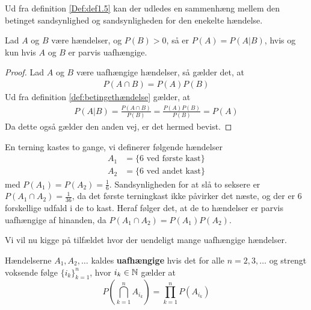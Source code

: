 Ud fra definition \ref{Def:def1.5} kan der udledes en sammenhæng mellem den betinget sandsynlighed og sandsynligheden for den enekelte hændelse. 
\begin{cor} %
    Lad $A$ og $B$ være hændelser, og $P(B) > 0$, så er $P(A)=P(A|B)$, hvis og kun hvis $A$ og $B$ er parvis uafhængige.   
\end{cor}
\begin{proof}
Lad $A$ og $B$ være uafhængige hændelser, så gælder det, at 
\begin{align*}
    P(A\cap B)=P(A)P(B)
\end{align*}
Ud fra definition \ref{def:betingethændelse} gælder, at 
\begin{align*}
    P(A|B)=\frac{P(A\cap B)}{P(B)} =\frac{P(A)P(B)}{P(B)}=P(A)
\end{align*}
Da dette også gælder den anden vej, er det hermed bevist.
\end{proof}

\begin{exmp} \label{exp:terning}
En terning kastes to gange, vi definerer følgende hændelser
\begin{align*}
  A_1 &=\{6 \text{ ved første kast}\} \\ A_2 &= \{6 \text{ ved andet kast}\} 
\end{align*}
med $P(A_1) = P(A_2) = \frac{1}{6}$. Sandsynligheden for at slå to seksere er $P(A_1 \cap A_2)=\frac{1}{36}$, da det første terningkast ikke påvirker det næste, og der er $6$ forskellige udfald i de to kast. Heraf følger det, at de to hændelser er parvis uafhængige af hinanden, da $P(A_1 \cap A_2) = P(A_1)P(A_2)$.
\end{exmp}

Vi vil nu kigge på tilfældet hvor der uendeligt mange uafhængige hændelser.
\begin{defn}
    Hændelserne $A_1, A_2, \ldots$ kaldes \textbf{uafhængige} hvis det for alle $n = 2, 3, \ldots$ og strengt voksende følge $\{i_k\}^n_{k = 1}$, hvor $i_k \in \mathbb{N}$ gælder at
    \begin{equation*}
        P\left(\bigcap_{k = 1}^n A_{i_k} \right) = \prod_{k = 1}^n P(A_{i_k})
    \end{equation*}
\end{defn}

%

